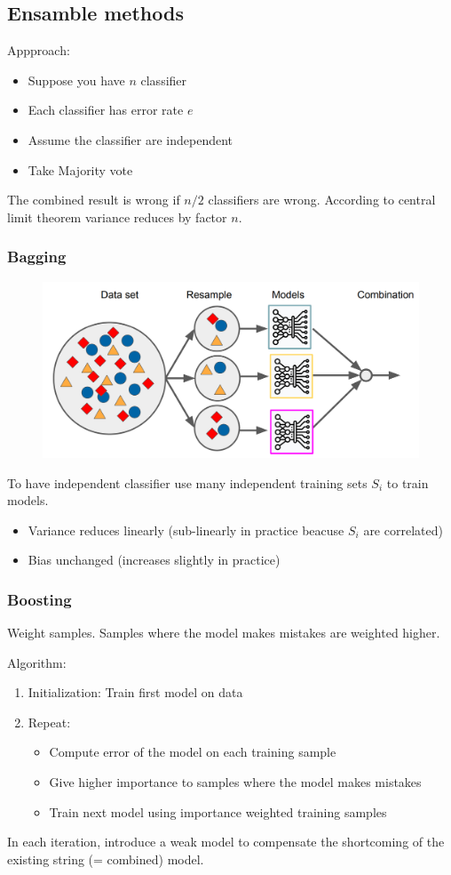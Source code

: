 \subsection{Ensamble methods}
Appproach:
\begin{itemize}
    \item Suppose you have \(n\) classifier
    \item Each classifier has error rate \(e\) 
    \item Assume the classifier are independent
    \item Take Majority vote
\end{itemize}
The combined result is wrong if \(n/2\) classifiers are wrong.
According  to central limit theorem variance reduces by factor \(n\).
\subsubsection{Bagging}
\begin{figure}[!h]
    \includegraphics[width = \columnwidth]{figures/04/Bagging.png}
\end{figure}
To have independent classifier use many independent training sets \(S_i\) to train models.
\begin{itemize}
    \item Variance reduces linearly (sub-linearly in practice beacuse \(S_i\) are correlated)
    \item Bias unchanged (increases slightly in practice)
\end{itemize}

\subsubsection{Boosting}
Weight samples. Samples where the model makes mistakes are weighted higher.

Algorithm:
\begin{enumerate}
    \item Initialization: Train first model on data
    \item Repeat:
    \begin{itemize}
        \item Compute error of the model on each training sample
        \item Give higher importance to samples where the model makes mistakes
        \item Train next model using importance weighted training samples
    \end{itemize}
\end{enumerate}
In each iteration, introduce a weak model to compensate the shortcoming of the existing string (= combined) model.
